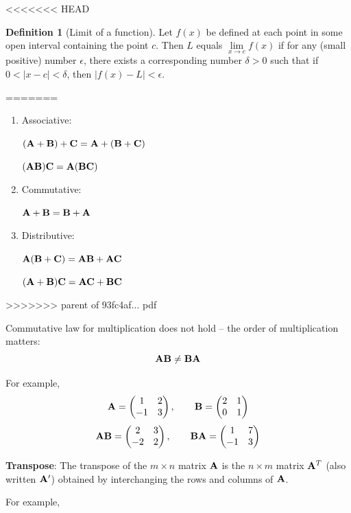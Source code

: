 \documentclass[]{book}
\theoremstyle{definition}
\newtheorem{definition}{Definition}[chapter]
\theoremstyle{definition}
\theoremstyle{definition}
\theoremstyle{remark}
\begin{document}
<<<<<<< HEAD
\begin{definition}[Limit of a function]
\protect\hypertarget{def:unnamed-chunk-5}{}{\label{def:unnamed-chunk-5} {} }Let \(f(x)\) be defined at each point in some open interval containing the point \(c\). Then \(L\) equals \(\lim\limits_{x \to c} f(x)\) if for any (small positive) number \(\epsilon\), there exists a corresponding number \(\delta>0\) such that if \(0<|x-c|<\delta\), then \(|f(x)-L|<\epsilon\).
\end{definition}
=======
\begin{enumerate}
        \item \parbox[t]{1.5in}{Associative:} $\bf (A+B)+C = A+(B+C)$\\
            \parbox[t]{1.5in}{\quad}  $\bf (AB)C = A(BC)$
        \item \parbox[t]{1.5in}{Commutative:} $\bf A+B=B+A$
        \item \parbox[t]{1.5in}{Distributive:} $\bf A(B+C)=AB+AC$\\
            \parbox[t]{1.5in}{\quad}   $\bf (A+B)C=AC+BC$
\end{enumerate}
>>>>>>> parent of 93fc4af... pdf

Commutative law for multiplication does not hold -- the order of multiplication matters:
\[\bf AB\ne BA\]

For example,
\[{\bf A}=\begin{pmatrix} 1&2\\-1&3\end{pmatrix}, \qquad {\bf B}=\begin{pmatrix} 2&1\\0&1\end{pmatrix}\]
\[{\bf AB}=\begin{pmatrix} 2&3\\-2&2\end{pmatrix}, \qquad {\bf BA}=\begin{pmatrix} 1&7\\-1&3\end{pmatrix}\]

\textbf{Transpose}: The transpose of the \(m\times n\) matrix \(\bf A\) is the \(n\times m\) matrix \({\bf A}^T\) (also written \({\bf A}'\)) obtained by interchanging the rows and columns of \(\bf A\).

For example,
\end{document}
